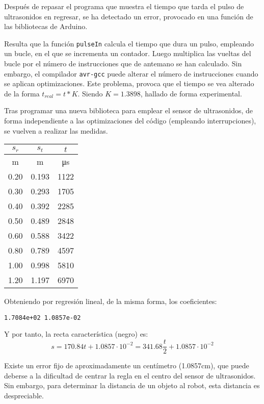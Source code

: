 \documentclass[10pt,a4paper,hidelinks,twocolumn]{article}
\begin{document}
Después de repasar el programa que muestra el tiempo que tarda el pulso de 
ultrasonidos en regresar, se ha detectado un error, provocado en una función de 
las bibliotecas de Arduino.

Resulta que la función \texttt{pulseIn} calcula el tiempo que dura un pulso, 
empleando un bucle, en el que se incrementa un contador. Luego multiplica las 
vueltas del bucle por el número de instrucciones que de antemano se han 
calculado. Sin embargo, el compilador \texttt{avr-gcc} puede alterar el número 
de instrucciones cuando se aplican optimizaciones. Este problema, provoca que el 
tiempo se vea alterado de la forma $ t_{real} = t * K $. Siendo $ K = 
1.3898 $, hallado de forma experimental.

Tras programar una nueva biblioteca para emplear el sensor de ultrasonidos, de 
forma independiente a las optimizaciones del código (empleando interrupciones), 
se vuelven a realizar las medidas.


\begin{center}
\begin{tabular}{ | c | c | c | }
\hline
$s_{r}$ & $s_{t}$ & $t$\\ \hline
m & m & \si{\micro\second} \\ \hline \hline
0.20 & 0.193 & 1122 \\ \hline
0.30 & 0.293 & 1705 \\ \hline
0.40 & 0.392 & 2285 \\ \hline
0.50 & 0.489 & 2848 \\ \hline
0.60 & 0.588 & 3422 \\ \hline
0.80 & 0.789 & 4597 \\ \hline
1.00 & 0.998 & 5810 \\ \hline
1.20 & 1.197 & 6970 \\ \hline
\end{tabular}
\end{center}

Obteniendo por regresión lineal, de la misma forma, los coeficientes:
\begin{center}
\texttt{1.7084e+02   1.0857e-02}
\end{center}
Y por tanto, la recta característica (negro) es:
$$ s = 170.84 t + 1.0857\cdot 10^{-2} = 341.68\frac{t}{2} + 1.0857\cdot 10^{-2}
$$

Existe un error fijo de aproximadamente un centímetro (1.0857cm), que puede 
deberse a la dificultad de centrar la regla en el centro del sensor de 
ultrasonidos. Sin embargo, para determinar la distancia de un objeto al robot, 
esta distancia es despreciable.
\end{document}
